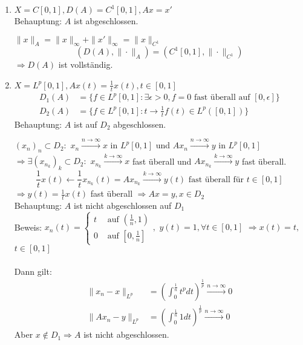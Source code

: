 \begin{beispiel}
	\begin{enumerate}[label=\alph*\upshape)]
		\item $X = C[0, 1], D(A) = C^{1}[0, 1], A x = x'$ \\
			Behauptung: $A$ ist abgeschlossen.
			\begin{beweis}
				$\| x \|_{A} = \| x \|_{\infty} + \| x' \|_{\infty} =  \| x \|_{C^{1}}$
				\[ \left( D(A), \| \cdot \|_{A} \right) = \left( C^{1}[0, 1], \| \cdot \|_{C^{1}} \right) \]
				$\Rightarrow D(A)$ ist vollständig.
			\end{beweis}
		\item $X = L^{p}[0, 1], A x(t) = \frac{1}{t} x(t), t \in [0, 1]$
			\begin{align*}
				D_{1}(A) & = \{ f \in L^{p}[0, 1]: \exists \epsilon > 0, f = 0 \text{ fast überall auf } [0, \epsilon] \} \\
				D_{2}(A) & = \{ f \in L^{p}[0, 1]: t \rightarrow \frac{1}{t} f(t) \in L^{p}\left([0, 1]\right) \}
			\end{align*}
			Behauptung: $A$ ist auf $D_{2}$ abgeschlossen.
			\begin{beweis}
				$(x_{n})_{n} \subset D_{2}:$ $x_{n} \xrightarrow[]{n \rightarrow \infty} x$ in $L^{p}[0, 1]$ und $A x_{n} \xrightarrow[]{n \rightarrow \infty} y$ in $L^{p}[0, 1]$ \\
				$\Rightarrow \exists (x_{n_{k}})_{k} \subset D_{2}:$ $x_{n_{k}} \xrightarrow[]{k \rightarrow \infty} x$ fast überall und $A x_{n_{k}} \xrightarrow[]{k \rightarrow \infty} y$ fast überall.
				\[ \frac{1}{t} x(t) \leftarrow \frac{1}{t} x_{n_{k}}(t) = A x_{n_{k}} \xrightarrow[]{k \rightarrow \infty} y(t) \text{ fast überall für } t \in [0, 1] \]
				$\Rightarrow y(t) = \frac{1}{t} x(t)$ fast überall $\Rightarrow A x = y, x \in D_{2}$ \\
				Behauptung: $A$ ist nicht abgeschlossen auf $D_{1}$ \\
				Beweis: $x_{n}(t) = \begin{cases} t & \text{ auf } (\frac{1}{n}, 1) \\ 0 & \text{ auf } [0, \frac{1}{n}]\end{cases},$ $y(t) = 1, \forall t \in [0, 1]$ $\Rightarrow x(t) = t,$ $t \in [0, 1]$ \\ \\
					Dann gilt:
					\begin{align*}
						\| x_{n} - x \|_{L^{p}} & = \left( \int_{0}^{\frac{1}{n}} t^{p} dt \right)^{\frac{1}{p}} \xrightarrow[]{n \rightarrow \infty} 0 \\
						\| A x_{n} - y \|_{L^{p}} & = \left( \int_{0}^{\frac{1}{n}} 1 dt \right)^{\frac{1}{p}} \xrightarrow[]{n \rightarrow \infty} 0 
					\end{align*}
					Aber $x \notin D_{1} \Rightarrow A$ ist nicht abgeschlossen.
			\end{beweis}
	\end{enumerate}
\end{beispiel}



\newpage